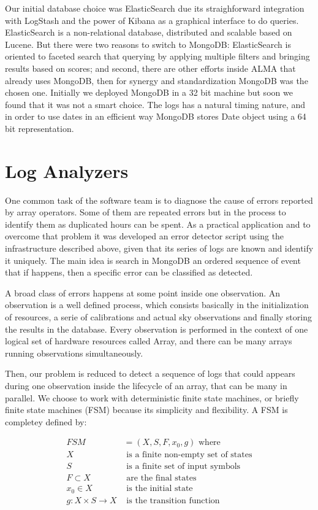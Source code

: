 \documentclass[]{spie}  %
\begin{document}
Our initial database choice was ElasticSearch due its straighforward
integration with LogStash and the power of Kibana as a graphical interface to
do queries. ElasticSearch is a non-relational database, distributed and
scalable based on Lucene\cite{es}. But there were two reasons to switch to MongoDB:
ElasticSearch is oriented to faceted search that querying by applying multiple
filters and bringing results based on scores; and second, there are other
efforts inside ALMA that already uses MongoDB\cite{shenexploring}, then for
synergy and standardization MongoDB was the chosen one. Initially we deployed
MongoDB in a 32 bit machine but soon we found that it was not a smart choice.
The logs has a natural timing nature, and in order to use dates in an efficient
way MongoDB stores Date object using a  64 bit  representation.

\section{Log Analyzers}
One common task of the software team is to diagnose the cause of errors
reported by array operators. Some of them are repeated errors but in the
process to identify them as duplicated hours can be spent. As a practical
application and to overcome that problem it was developed an error detector
script using the infrastructure described above, given that its series of logs
are known and identify it uniquely. The main idea is search in MongoDB an
ordered sequence of event that if happens, then a specific error can be
classified as detected.

A broad class of errors happens at some point inside one observation. An
observation is a well defined process, which consists basically in the
initialization of resources, a serie of calibrations and actual sky
observations and finally storing the results in the database. Every observation
is performed in the context of one logical set of hardware resources called
Array, and there can be many arrays running observations simultaneously. 

Then, our problem is reduced to detect a sequence of logs that could appears
during one observation inside the lifecycle of an array, that can be many in
parallel. We choose to work with deterministic finite state machines, or
briefly finite state machines (FSM) because its simplicity and flexibility. A
FSM is completey defined by:

\begin{align*}
FSM &= (X,S,F,x_{0},g) \mbox{ where}\\
X & \mbox{ is a finite non-empty set of states}\\
S & \mbox{ is a finite set of input symbols}\\
F \subset X & \mbox{ are the final states}\\
x_{0} \in X & \mbox{ is the initial state}\\
g: X \times S \to X & \mbox{ is the transition function}
\end{align*}
\end{document}
